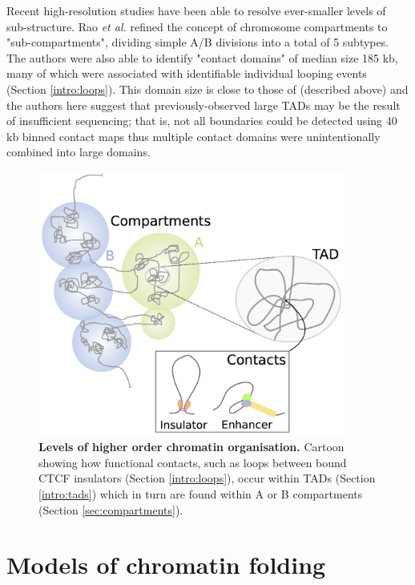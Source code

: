 \documentclass[a4paper,11pt,oneside]{book}
\begin{document}
Recent high-resolution studies have been able to resolve ever-smaller levels of sub-structure. Rao \emph{et al.}\cite{Rao2014} refined the concept of chromosome compartments to "sub-compartments", dividing simple A/B divisions into a total of 5 subtypes. The authors were also able to identify "contact domains" of median size 185 kb, many of which were associated with identifiable individual looping events (Section \ref{intro:loops}).\cite{Rao2014} This domain size is close to those of \citet{Filippova2014} (described above) and the authors here suggest that previously-observed large TADs may be the result of insufficient sequencing; that is, not all boundaries could be detected using 40 kb binned contact maps thus multiple contact domains were unintentionally combined into large domains.

\begin{figure}
\begin{center}
\includegraphics[width=4in]{figs/genome_org.png}
\captionsetup{width=\textwidth}
\caption[Levels of higher order chromatin organisation.]{ {\bf Levels of higher order chromatin organisation. } 
  Cartoon showing how functional contacts, such as loops between bound CTCF insulators (Section \ref{intro:loops}), occur within TADs (Section \ref{intro:tads}) which in turn are found within A or B compartments (Section \ref{sec:compartments}).
}\label{fig:genomeorg}
\end{center}
\end{figure} 

\section{Models of chromatin folding}
\end{document}
